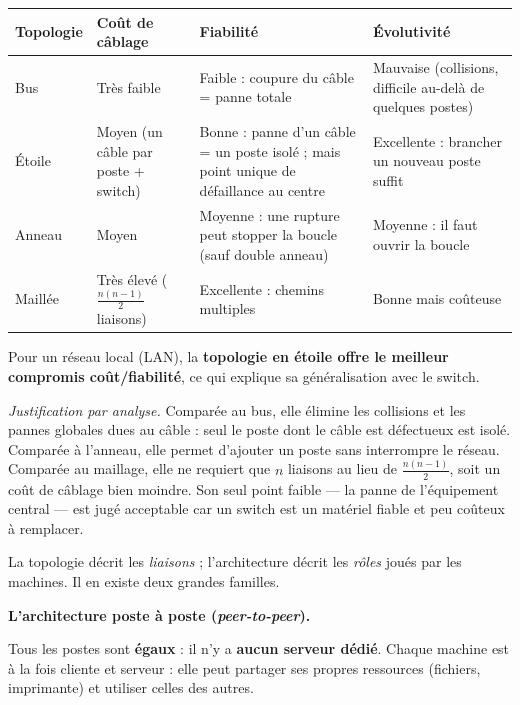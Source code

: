 \documentclass[11pt]{article}
\newcommand{\cle}[1]{{\popxbold\color{popdark}#1}}
\newcounter{popsec}
\newcounter{popsub}
\newcommand{\courssub}[1]{%
  \stepcounter{popsub}%
  \par\vspace{9pt}\noindent{\popxbold\fontsize{11.5}{13}\selectfont\color{popink}{\color{poporange}\thepopsec.\thepopsub}\hspace{6pt}#1}\par\nopagebreak\vspace{4pt}
}
\begin{document}
\begin{center}
\begin{tabularx}{\linewidth}{|l|X|X|X|}
\hline
\rowcolor{popblueL} \textbf{Topologie} & \textbf{Coût de câblage} & \textbf{Fiabilité} & \textbf{Évolutivité} \\
\hline
Bus & Très faible & Faible : coupure du câble = panne totale & Mauvaise (collisions, difficile au-delà de quelques postes) \\
\hline
Étoile & Moyen (un câble par poste + switch) & Bonne : panne d'un câble = un poste isolé ; mais point unique de défaillance au centre & Excellente : brancher un nouveau poste suffit \\
\hline
Anneau & Moyen & Moyenne : une rupture peut stopper la boucle (sauf double anneau) & Moyenne : il faut ouvrir la boucle \\
\hline
Maillée & Très élevé ($\frac{n(n-1)}{2}$ liaisons) & Excellente : chemins multiples & Bonne mais coûteuse \\
\hline
\end{tabularx}
\end{center}

\begin{propriete}
Pour un réseau local (LAN), la \textbf{topologie en étoile offre le meilleur compromis coût/fiabilité}, ce qui explique sa généralisation avec le switch.

\emph{Justification par analyse.} Comparée au bus, elle élimine les collisions et les pannes globales dues au câble : seul le poste dont le câble est défectueux est isolé. Comparée à l'anneau, elle permet d'ajouter un poste sans interrompre le réseau. Comparée au maillage, elle ne requiert que $n$ liaisons au lieu de $\frac{n(n-1)}{2}$, soit un coût de câblage bien moindre. Son seul point faible — la panne de l'équipement central — est jugé acceptable car un switch est un matériel fiable et peu coûteux à remplacer.
\end{propriete}

\courssub{Les architectures des réseaux}

La topologie décrit les \emph{liaisons} ; l'\cle{architecture} décrit les \emph{rôles} joués par les machines. Il en existe deux grandes familles.

\textbf{L'architecture poste à poste (\emph{peer-to-peer}).}\par
Tous les postes sont \textbf{égaux} : il n'y a \textbf{aucun serveur dédié}. Chaque machine est à la fois cliente et serveur : elle peut partager ses propres ressources (fichiers, imprimante) et utiliser celles des autres.
\end{document}
